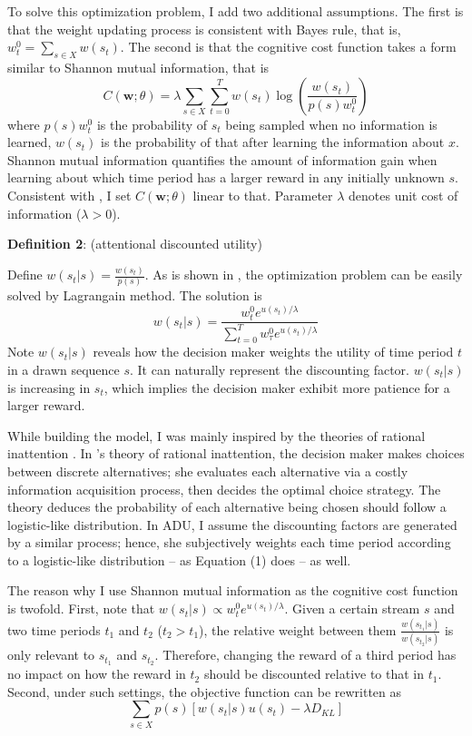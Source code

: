 \documentclass[
  12pt,
]{article}
\begin{document}
To solve this optimization problem, I add two additional assumptions.
The first is that the weight updating process is consistent with Bayes
rule, that is, \(w^0_t=\sum_{s\in X} w(s_t)\). The second is that the
cognitive cost function takes a form similar to Shannon mutual
information, that is\[
C(\textbf{w};\theta)= \lambda \sum_{s\in X}\sum_{t=0}^T w(s_t) \log\left(\frac{w(s_t)}{p(s)w_t^0}\right)
\]where \(p(s)w^0_t\) is the probability of \(s_t\) being sampled when
no information is learned, \(w(s_t)\) is the probability of that after
learning the information about \(x\). Shannon mutual information
quantifies the amount of information gain when learning about which time
period has a larger reward in any initially unknown \(s\). Consistent
with \citet{matejka_rational_2015}, I set \(C(\textbf{w};\theta)\)
linear to that. Parameter \(\lambda\) denotes unit cost of information
(\(\lambda>0\)).

\textbf{Definition 2}: (attentional discounted utility)

Define \(w(s_t|s) = \frac{w(s_t)}{p(s)}\). As is shown in
\citet{matejka_rational_2015}, the optimization problem can be easily
solved by Lagrangain method. The solution is\[ \tag{1}
w(s_t|s) =\frac{w_t^0e^{u(s_t)/\lambda}}{\sum_{t=0}^T w_\tau^0 e^{u(s_t)/\lambda}}
\]Note \(w(s_t|s)\) reveals how the decision maker weights the utility
of time period \(t\) in a drawn sequence \(s\). It can naturally
represent the discounting factor. \(w(s_t|s)\) is increasing in \(s_t\),
which implies the decision maker exhibit more patience for a larger
reward.

While building the model, I was mainly inspired by the theories of
rational inattention
\citep{matejka_rational_2015, jung_discrete_2019, mackowiak_rational_2023}.
In \citet{matejka_rational_2015}'s theory of rational inattention, the
decision maker makes choices between discrete alternatives; she
evaluates each alternative via a costly information acquisition process,
then decides the optimal choice strategy. The theory deduces the
probability of each alternative being chosen should follow a
logistic-like distribution. In ADU, I assume the discounting factors are
generated by a similar process; hence, she subjectively weights each
time period according to a logistic-like distribution -- as Equation (1)
does -- as well.

The reason why I use Shannon mutual information as the cognitive cost
function is twofold. First, note that
\(w(s_t|s) \propto w^0_t e^{u(s_t)/\lambda}\). Given a certain stream
\(s\) and two time periods \(t_1\) and \(t_2\) (\(t_2>t_1\)), the
relative weight between them \(\frac{w(s_{t_1}|s)}{w(s_{t_2}|s)}\) is
only relevant to \(s_{t_1}\) and \(s_{t_2}\). Therefore, changing the
reward of a third period has no impact on how the reward in \(t_2\)
should be discounted relative to that in \(t_1\). Second, under such
settings, the objective function can be rewritten as\[
\sum_{s\in X} p(s)[w(s_t|s)u(s_t) - \lambda D_{KL}]
\]
\end{document}
